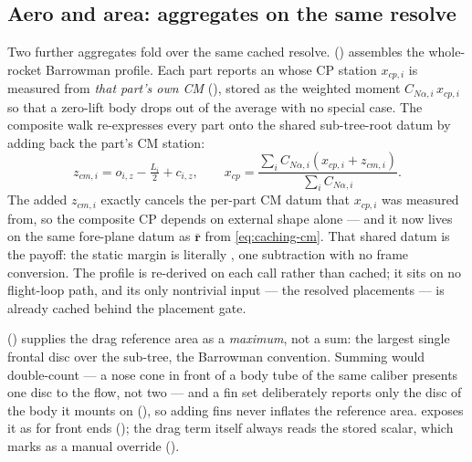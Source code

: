 \subsection{Aero and area: aggregates on the same resolve}\label{sec:caching-aero}

Two further aggregates fold over the same cached resolve. 
() assembles the whole-rocket Barrowman profile. Each part
reports an  whose CP station $x_{cp,i}$ is measured from \emph{that part's own
CM} (), stored as the weighted moment $C_{N\alpha,i}\,x_{cp,i}$ so that a
zero-lift body drops out of the average with no special case. The composite walk re-expresses
every part onto the shared sub-tree-root datum by adding back the part's CM station:
\begin{equation}
z_{cm,i} = o_{i,z} - \tfrac{L_i}{2} + c_{i,z},
\qquad
x_{cp} = \frac{\sum_i C_{N\alpha,i}\left(x_{cp,i} + z_{cm,i}\right)}
              {\sum_i C_{N\alpha,i}}.
\label{eq:caching-datum}
\end{equation}
The added $z_{cm,i}$ exactly cancels the per-part CM datum that $x_{cp,i}$ was measured from, so
the composite CP depends on external shape alone --- and it now lives on the same fore-plane datum
as $\bar{\mathbf{r}}$ from \cref{eq:caching-cm}. That shared datum is the payoff: the static
margin is literally , one subtraction with no frame conversion. The
profile is re-derived on each call rather than cached; it sits on no flight-loop path, and its
only nontrivial input --- the resolved placements --- is already cached behind the placement gate.

 () supplies the drag reference
area as a \emph{maximum}, not a sum: the largest single frontal disc over the sub-tree, the
Barrowman convention. Summing would double-count --- a nose cone in front of a body tube of the
same caliber presents one disc to the flow, not two --- and a fin set deliberately reports only
the disc of the body it mounts on (), so adding fins never
inflates the reference area.  exposes it as
 for front ends ();
the drag term itself always reads the stored  scalar, which
 marks as a manual override ().

